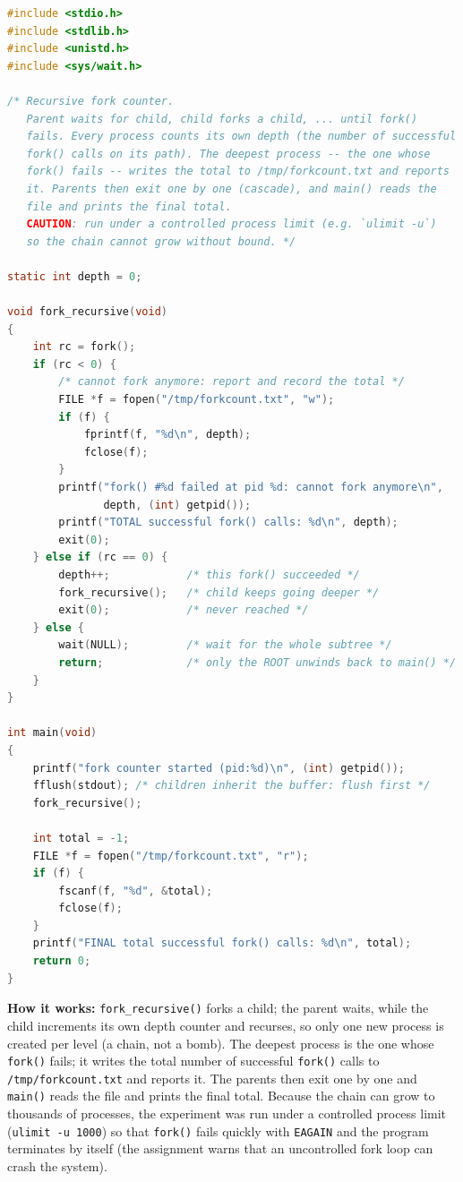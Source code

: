 \documentclass[11pt,a4paper]{article}
\begin{document}
\begin{lstlisting}[language=C]
#include <stdio.h>
#include <stdlib.h>
#include <unistd.h>
#include <sys/wait.h>

/* Recursive fork counter.
   Parent waits for child, child forks a child, ... until fork()
   fails. Every process counts its own depth (the number of successful
   fork() calls on its path). The deepest process -- the one whose
   fork() fails -- writes the total to /tmp/forkcount.txt and reports
   it. Parents then exit one by one (cascade), and main() reads the
   file and prints the final total.
   CAUTION: run under a controlled process limit (e.g. `ulimit -u`)
   so the chain cannot grow without bound. */

static int depth = 0;

void fork_recursive(void)
{
    int rc = fork();
    if (rc < 0) {
        /* cannot fork anymore: report and record the total */
        FILE *f = fopen("/tmp/forkcount.txt", "w");
        if (f) {
            fprintf(f, "%d\n", depth);
            fclose(f);
        }
        printf("fork() #%d failed at pid %d: cannot fork anymore\n",
               depth, (int) getpid());
        printf("TOTAL successful fork() calls: %d\n", depth);
        exit(0);
    } else if (rc == 0) {
        depth++;            /* this fork() succeeded */
        fork_recursive();   /* child keeps going deeper */
        exit(0);            /* never reached */
    } else {
        wait(NULL);         /* wait for the whole subtree */
        return;             /* only the ROOT unwinds back to main() */
    }
}

int main(void)
{
    printf("fork counter started (pid:%d)\n", (int) getpid());
    fflush(stdout); /* children inherit the buffer: flush first */
    fork_recursive();
    
    int total = -1;
    FILE *f = fopen("/tmp/forkcount.txt", "r");
    if (f) {
        fscanf(f, "%d", &total);
        fclose(f);
    }
    printf("FINAL total successful fork() calls: %d\n", total);
    return 0;
}
\end{lstlisting}

\noindent\textbf{How it works:} \texttt{fork\_recursive()} forks a child; the parent waits, while the child increments its own depth counter and recurses, so only one new process is created per level (a chain, not a bomb). The deepest process is the one whose \texttt{fork()} fails; it writes the total number of successful \texttt{fork()} calls to \texttt{/tmp/forkcount.txt} and reports it. The parents then exit one by one and \texttt{main()} reads the file and prints the final total. Because the chain can grow to thousands of processes, the experiment was run under a controlled process limit (\texttt{ulimit -u 1000}) so that \texttt{fork()} fails quickly with \texttt{EAGAIN} and the program terminates by itself (the assignment warns that an uncontrolled fork loop can crash the system).
\end{document}
